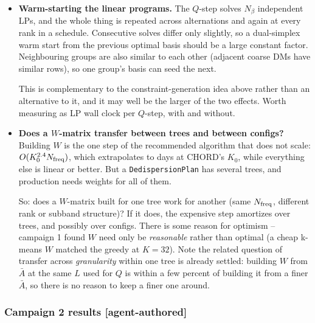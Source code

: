 \documentclass{article}
\numberwithin{equation}{section}   %
\begin{document}
\begin{itemize}
 It has several practical advantages worth testing: it is deterministic, it costs
 $O(K N_\beta N_{\rm freq})$ rather than the $O(K_0^{2.4})$ of the agglomerative greedy, the
 atoms stay nonnegative and interpretable (each is a real output's frequency response), and
 the pivot order gives a natural nested sequence of $W$-matrices -- which is exactly what a
 rank schedule wants.

\item {\bf Warm-starting the linear programs.}
 The $Q$-step solves $N_\beta$ independent LPs, and the whole thing is repeated across
 alternations and again at every rank in a schedule. Consecutive solves differ only
 slightly, so a dual-simplex warm start from the previous optimal basis should be a large
 constant factor. Neighbouring groups are also similar to each other (adjacent coarse DMs
 have similar rows), so one group's basis can seed the next.

 This is complementary to the constraint-generation idea above rather than an alternative to
 it, and it may well be the larger of the two effects. Worth measuring as LP wall clock per
 $Q$-step, with and without.

\item {\bf Does a $W$-matrix transfer between trees and between configs?}
 Building $W$ is the one step of the recommended algorithm that does not scale:
 $O(K_0^{2.4} N_{\rm freq})$, which extrapolates to days at CHORD's $K_0$, while everything
 else is linear or better. But a {\tt DedispersionPlan} has several trees, and production
 needs weights for all of them.

 So: does a $W$-matrix built for one tree work for another (same $N_{\rm freq}$, different
 rank or subband structure)? If it does, the expensive step amortizes over trees, and
 possibly over configs. There is some reason for optimism -- campaign 1 found $W$
 need only be {\em reasonable} rather than optimal (a cheap k-means $W$ matched the
 greedy at $K=32$). Note the related question of transfer across {\em granularity} within one
 tree is already settled: building $W$ from $\bar A$ at the same $L$ used for
 $Q$ is within a few percent of building it from a finer $\bar A$, so there is no
 reason to keep a finer one around.

\end{itemize}

\subsubsection{Campaign 2 results [agent-authored]}
\label{ssec:campaign2_results}
\end{document}
